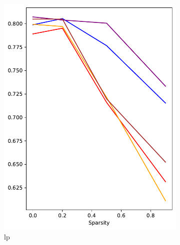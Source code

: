 \documentclass[mathematics,article,submit,pdftex,moreauthors]{Definitions/mdpi}
\begin{document}
\begin{figure}[!ht]
\begin{subfigure}[t]{.284\textwidth}
        \includegraphics[width=.95\linewidth]{figures/test/pruning-testing-score_CCSC_linear.pdf}
        \caption{\ac{lp}}
        \label{fig:results:test:sscs:lp}
      \end{subfigure}
      \hfill
      \begin{subfigure}[t]{.274\textwidth} 
        \centering

\end{subfigure}
\end{figure}
\end{document}
